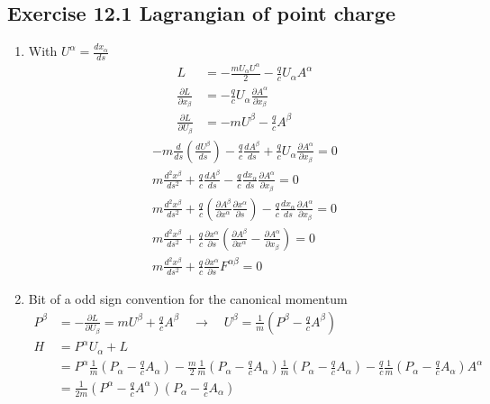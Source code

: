\documentclass[10pt,a4paper]{book}
\theoremstyle{definition}
\begin{document}
\subsection{Exercise 12.1 Lagrangian of point charge}
\begin{enumerate}
\item With $U^\alpha=\frac{dx_\alpha}{ds}$
\begin{align}
	L&=-\frac{mU_\alpha U^\alpha}{2}-\frac{q}{c}U_\alpha A^\alpha\\
	\frac{\partial L}{\partial x_\beta}&=-\frac{q}{c}U_\alpha\frac{\partial A^\alpha}{\partial x_\beta}\\
	\frac{\partial L}{\partial U_\beta}&=-mU^\beta-\frac{q}{c}A^\beta
\end{align}
\begin{align}
	-m\frac{d}{ds}\left(\frac{dU^\beta}{ds}\right)-\frac{q}{c}\frac{dA^\beta}{ds}+\frac{q}{c}U_\alpha\frac{\partial A^\alpha}{\partial x_\beta}=0\\
	m\frac{d^2x^\beta}{ds^2}+\frac{q}{c}\frac{dA^\beta}{ds}-\frac{q}{c}\frac{dx_\alpha}{ds}\frac{\partial A^\alpha}{\partial x_\beta}=0\\
	m\frac{d^2x^\beta}{ds^2}+\frac{q}{c}\left(\frac{\partial A^\beta}{\partial x^\alpha}\frac{\partial x^\alpha}{\partial s}\right)-\frac{q}{c}\frac{dx_\alpha}{ds}\frac{\partial A^\alpha}{\partial x_\beta}=0\\
	m\frac{d^2x^\beta}{ds^2}+\frac{q}{c}\frac{\partial x^\alpha}{\partial s}\left(\frac{\partial A^\beta}{\partial x^\alpha}-\frac{\partial A^\alpha}{\partial x_\beta}\right)=0\\
	m\frac{d^2x^\beta}{ds^2}+\frac{q}{c}\frac{\partial x^\alpha}{\partial s}F^{\alpha\beta}=0
\end{align}
\item Bit of a odd sign convention for the canonical momentum
\begin{align}
P^\beta&=-\frac{\partial L}{\partial U_\beta}=mU^\beta+\frac{q}{c}A^\beta\quad\rightarrow\quad U^\beta=\frac{1}{m}\left(P^\beta-\frac{q}{c}A^\beta\right)\\
H&=P^\alpha U_\alpha+L\\
&=P^\alpha\frac{1}{m}\left(P_\alpha-\frac{q}{c}A_\alpha\right)-\frac{m}{2}\frac{1}{m}\left(P_\alpha-\frac{q}{c}A_\alpha\right)\frac{1}{m}\left(P_\alpha-\frac{q}{c}A_\alpha\right)-\frac{q}{c}\frac{1}{m}\left(P_\alpha-\frac{q}{c}A_\alpha\right)A^\alpha\\
&=\frac{1}{2m}\left(P^\alpha-\frac{q}{c}A^\alpha\right)\left(P_\alpha-\frac{q}{c}A_\alpha\right)

\end{align}
\end{enumerate}
\end{document}
